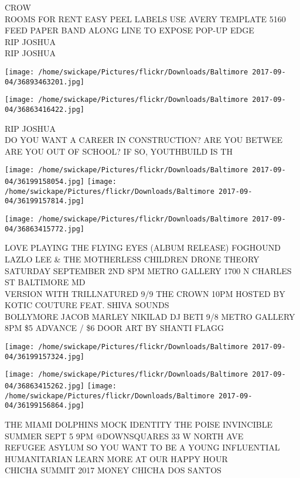\documentclass[10pt,letterpaper]{article}
\begin{document}
CROW\\
ROOMS FOR RENT EASY PEEL LABELS USE AVERY TEMPLATE 5160 FEED PAPER BAND ALONG LINE TO EXPOSE POP{-}UP EDGE\\
RIP JOSHUA\\
RIP JOSHUA
\pagebreak

\texttt{[image: /home/swickape/Pictures/flickr/Downloads/Baltimore 2017-09-04/36893463201.jpg]}

\vspace{0.25in}
\texttt{[image: /home/swickape/Pictures/flickr/Downloads/Baltimore 2017-09-04/36863416422.jpg]}

RIP JOSHUA\\
DO YOU WANT A CAREER IN CONSTRUCTION?  ARE YOU BETWEE  ARE YOU OUT OF SCHOOL?  IF SO, YOUTHBUILD IS TH
\pagebreak

\texttt{[image: /home/swickape/Pictures/flickr/Downloads/Baltimore 2017-09-04/36199158054.jpg]}
\texttt{[image: /home/swickape/Pictures/flickr/Downloads/Baltimore 2017-09-04/36199157814.jpg]}

\texttt{[image: /home/swickape/Pictures/flickr/Downloads/Baltimore 2017-09-04/36863415772.jpg]}

LOVE PLAYING THE FLYING EYES (ALBUM RELEASE) FOGHOUND LAZLO LEE \& THE MOTHERLESS CHILDREN DRONE THEORY SATURDAY SEPTEMBER 2ND 8PM METRO GALLERY 1700 N CHARLES ST BALTIMORE MD\\
VERSION WITH TRILLNATURED 9/9 THE CROWN 10PM HOSTED BY KOTIC COUTURE FEAT. SHIVA SOUNDS\\
BOLLYMORE JACOB MARLEY NIKILAD DJ BETI 9/8 METRO GALLERY 8PM \$5 ADVANCE / \$6 DOOR ART BY SHANTI FLAGG
\pagebreak

\texttt{[image: /home/swickape/Pictures/flickr/Downloads/Baltimore 2017-09-04/36199157324.jpg]}

\vspace{0.25in}
\texttt{[image: /home/swickape/Pictures/flickr/Downloads/Baltimore 2017-09-04/36863415262.jpg]}
\texttt{[image: /home/swickape/Pictures/flickr/Downloads/Baltimore 2017-09-04/36199156864.jpg]}

THE MIAMI DOLPHINS MOCK IDENTITY THE POISE INVINCIBLE SUMMER SEPT 5 9PM @DOWNSQUARES 33 W NORTH AVE\\
REFUGEE ASYLUM SO YOU WANT TO BE A YOUNG INFLUENTIAL HUMANITARIAN LEARN MORE AT OUR HAPPY HOUR\\
CHICHA SUMMIT 2017 MONEY CHICHA DOS SANTOS
\pagebreak
\end{document}
